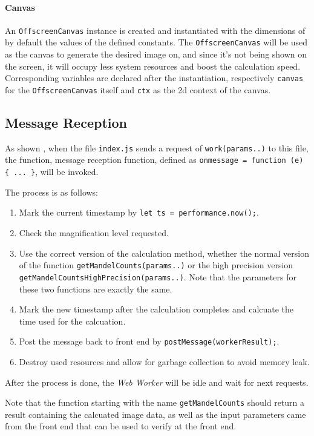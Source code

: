 \paragraph{Canvas} An \texttt{OffscreenCanvas} instance is created and instantiated with the dimensions of by default the values of the defined constants. The \texttt{OffscreenCanvas} will be used as the canvas to generate the desired image on, and since it's not being shown on the screen, it will occupy less system resources and boost the calculation speed. Corresponding variables are declared after the instantiation, respectively \texttt{canvas} for the \texttt{OffscreenCanvas} itself and \texttt{ctx} as the 2d context of the canvas.

\subsection{Message Reception}

As shown , when the file \texttt{index.js} sends a request of \texttt{work(params..)} to this file, the function, message reception function, defined as \texttt{onmessage = function (e) \{ ... \}}, will be invoked.

The process is as follows:

\begin{enumerate}
  \item Mark the current timestamp by \texttt{let ts = performance.now();}.
  \item Check the magnification level requested.
  \item Use the correct version of the calculation method, whether the normal version of the function \texttt{getMandelCounts(params..)} or the high precision version \texttt{getMandelCountsHighPrecision(params..)}. Note that the parameters for these two functions are exactly the same.
  \item Mark the new timestamp after the calculation completes and calcuate the time used for the calcuation.
  \item Post the message back to front end by \texttt{postMessage(workerResult);}.
  \item Destroy used resources and allow for garbage collection to avoid memory leak.
\end{enumerate}

After the process is done, the \emph{Web Worker} will be idle and wait for next requests.

Note that the function starting with the name \texttt{getMandelCounts} should return a result containing the calcuated image data, as well as the input parameters came from the front end that can be used to verify at the front end.


